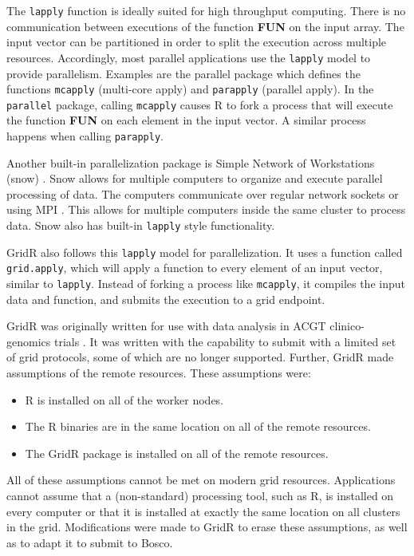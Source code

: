 The \texttt{lapply} function is ideally suited for high throughput computing.  There is no communication between executions of the function \textbf{FUN} on the input array.  The input vector can be partitioned in order to split the execution across multiple resources.  Accordingly, most parallel applications use the \texttt{lapply} model to provide parallelism.  Examples are the parallel package which defines the functions \texttt{mcapply} (multi-core apply) and \texttt{parapply} (parallel apply). In the \texttt{parallel} package, calling \texttt{mcapply} causes R to fork a process that will execute the function \textbf{FUN} on each element in the input vector.  A similar process happens when calling \texttt{parapply}. 

Another built-in parallelization package is Simple Network of Workstations (snow) \cite{rlangsnow}.  Snow allows for multiple computers to organize and execute parallel processing of data.  The computers communicate over regular network sockets or using MPI \cite{gropp1999using}.  This allows for multiple computers inside the same cluster to process data.  Snow also has built-in \texttt{lapply} style functionality.

GridR also follows this \texttt{lapply} model for parallelization.  It uses a function called \texttt{grid.apply}, which will apply a function to every element of an input vector, similar to \texttt{lapply}.  Instead of forking a process like \texttt{mcapply}, it compiles the input data and function, and submits the execution to a grid endpoint.

GridR was originally written for use with data analysis in ACGT clinico-genomics trials \cite{wegener2007gridr}.  It was written with the capability to submit with a limited set of grid protocols, some of which are no longer supported.  Further, GridR made assumptions of the remote resources.  These assumptions were:

\begin{itemize}
\item R is installed on all of the worker nodes.
\item The R binaries are in the same location on all of the remote resources.
\item The GridR package is installed on all of the remote resources.
\end{itemize}

All of these assumptions cannot be met on modern grid resources.  Applications cannot assume that a (non-standard) processing tool, such as R, is installed on every computer or   that it is installed at exactly the same location on all clusters in the grid.  Modifications were made to GridR to erase these assumptions, as well as to adapt it to submit to Bosco.

